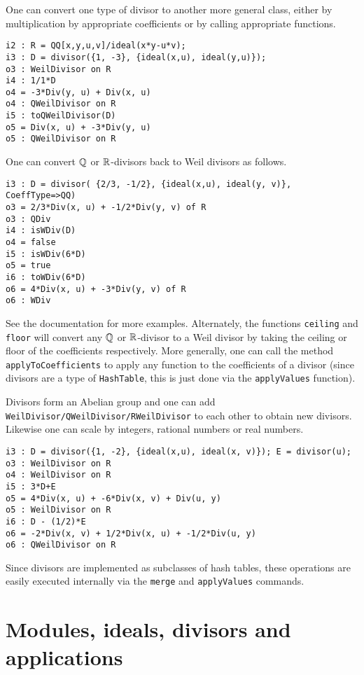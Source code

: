 \documentclass[11pt]{amsart}
\begin{document}
One can convert one type of divisor to another more general class, either by multiplication by appropriate coefficients or by calling appropriate functions.
\begin{verbatim}
i2 : R = QQ[x,y,u,v]/ideal(x*y-u*v);
i3 : D = divisor({1, -3}, {ideal(x,u), ideal(y,u)});
o3 : WeilDivisor on R
i4 : 1/1*D
o4 = -3*Div(y, u) + Div(x, u)
o4 : QWeilDivisor on R
i5 : toQWeilDivisor(D)
o5 = Div(x, u) + -3*Div(y, u)
o5 : QWeilDivisor on R
\end{verbatim}
One can convert $\mathbb{Q}$ or $\mathbb{R}$-divisors back to Weil divisors as follows.
\begin{verbatim}
i3 : D = divisor( {2/3, -1/2}, {ideal(x,u), ideal(y, v)}, CoeffType=>QQ)
o3 = 2/3*Div(x, u) + -1/2*Div(y, v) of R
o3 : QDiv
i4 : isWDiv(D)
o4 = false
i5 : isWDiv(6*D)
o5 = true
i6 : toWDiv(6*D)
o6 = 4*Div(x, u) + -3*Div(y, v) of R
o6 : WDiv
\end{verbatim}
See the documentation for more examples.  Alternately, the functions {\tt ceiling} and {\tt floor} will convert any $\mathbb{Q}$ or $\mathbb{R}$-divisor to a Weil divisor by taking the ceiling or floor of the coefficients respectively.  More generally, one can call the method {\tt applyToCoefficients} to apply any function to the coefficients of a divisor (since divisors are a type of {\tt HashTable}, this is just done via the {\tt applyValues} function).

Divisors form an Abelian group and one can add {\tt WeilDivisor/QWeilDivisor/RWeilDivisor} to each other to obtain new divisors.  Likewise one can scale by integers, rational numbers or real numbers.
\begin{verbatim}
i3 : D = divisor({1, -2}, {ideal(x,u), ideal(x, v)}); E = divisor(u);
o3 : WeilDivisor on R
o4 : WeilDivisor on R
i5 : 3*D+E
o5 = 4*Div(x, u) + -6*Div(x, v) + Div(u, y)
o5 : WeilDivisor on R
i6 : D - (1/2)*E
o6 = -2*Div(x, v) + 1/2*Div(x, u) + -1/2*Div(u, y)
o6 : QWeilDivisor on R
\end{verbatim}

Since divisors are implemented as subclasses of hash tables, these operations are easily executed internally via the {\tt merge} and {\tt applyValues} commands.

\section{Modules, ideals, divisors and applications}
\label{sec.Modules}
\end{document}
